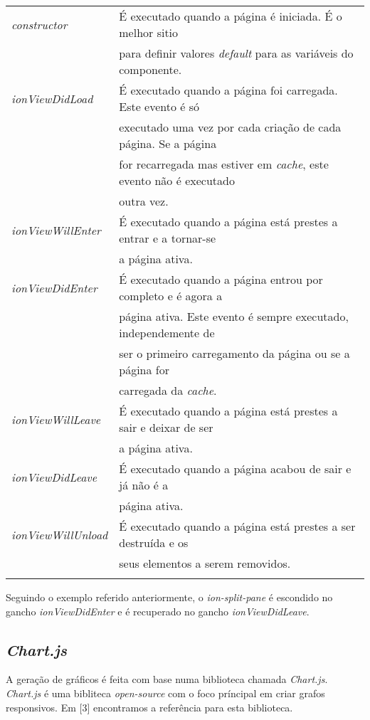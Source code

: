 \begin{tabular}{ll}
	\textit{constructor} & É executado quando a página é iniciada. É o melhor sitio \\
	&para definir valores \textit{default} para as variáveis do componente.\\
	\textit{ionViewDidLoad} & É executado quando a página foi carregada. Este evento é só \\
	&executado uma vez por cada criação de cada página. Se a página \\
	&for recarregada mas estiver em \textit{cache}, este evento não é executado\\
	& outra vez.\\
	\textit{ionViewWillEnter} & É executado quando a página está prestes a entrar e a tornar-se \\
	&a página ativa.\\
	\textit{ionViewDidEnter} & É executado quando a página entrou por completo e é agora a \\
	&página ativa. Este evento é sempre executado, independemente de \\
	&ser o primeiro carregamento da página ou se a página for \\
	&carregada da \textit{cache}.\\
	\textit{ionViewWillLeave} & É executado quando a página está prestes a sair e deixar de ser \\
	&a página ativa.\\
	\textit{ionViewDidLeave} & É executado quando a página acabou de sair e já não é a \\
	&página ativa.\\
	\textit{ionViewWillUnload} & É executado quando a página está prestes a ser destruída e os \\
	&seus elementos a serem removidos.\\
	\\
\end{tabular}

Seguindo o exemplo referido anteriormente, o \textit{ion-split-pane} é escondido no gancho \textit{ionViewDidEnter} e é recuperado no gancho \textit{ionViewDidLeave}.

\newpage

\subsection{\textit{Chart.js}}

A geração de gráficos é feita com base numa biblioteca chamada \textit{Chart.js}. \textit{Chart.js} é uma bibliteca \textit{open-source} com o foco príncipal em criar grafos responsivos. Em [3] encontramos a referência para esta biblioteca. 

